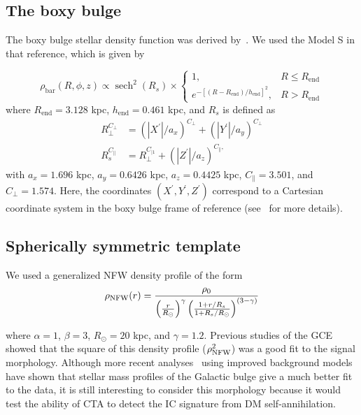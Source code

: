 \documentclass[doublespace,nopageskip]{VTthesis} %
\begin{document}
\begin{appendices}
\subsection{The boxy bulge}

The boxy bulge stellar density function was derived by~\cite{Freudenreich:1998}. We used the Model S in that reference, which is given by

\begin{equation}
\rho_{\mathrm{bar}}(R, \phi, z) \propto  \operatorname{sech}^{2}\left(R_{s}\right)
 \times\left\{
 \begin{array}{lr}
1, & R \leq R_{\mathrm{end}} \\
e^{-\left[\left(R-R_{\mathrm{end}}\right) / h_{\mathrm{end}}\right]^{2}}, & R>R_{\mathrm{end}}
\end{array}\right.\label{eq:boxybulge}
\end{equation}
where $R_{\mathrm{end}}=3.128$ kpc, $h_{\mathrm{end}}=0.461$ kpc, and $R_s$ is defined as
\begin{equation}
\begin{aligned}
R_{\perp}^{C_{\perp}} &=\left(\left|X^{\prime}\right| / a_{x}\right)^{C_{\perp}}+\left(\left|Y^{\prime}\right| / a_{y}\right)^{C_{\perp}} \\
R_{s}^{C_{\|}} &=R_{\perp}^{C_{\mid 1}}+\left(\left|Z^{\prime}\right| / a_{z}\right)^{C_{\|},}
\end{aligned}    
\end{equation}
with  $a_{x}=1.696$ kpc, $a_{y}=0.6426$ kpc, $a_{z}=0.4425$ kpc, $C_{\|}=3.501$, and $C_{\perp}=1.574$.  Here, the coordinates $(X^\prime,Y^\prime,Z^\prime)$ correspond to a Cartesian coordinate system in the boxy bulge frame of reference (see~\citealt{Song:2019nrx} for more details).

\subsection{Spherically symmetric template}

We used a generalized NFW density profile of the form 
\begin{equation}\label{eq:NFW}
    \rho_{\rm NFW}(r)=\frac{\rho_{0}}{\left(\frac{r}{R_{\odot}}\right)^{\gamma}\left(\frac{1+r / R_{s}}{1+R_{s} / R_{\odot}}\right)^{(3-\gamma)}}
\end{equation}

where $\alpha=1$, $\beta=3$, $R_{\odot}=20$ kpc, and $\gamma=1.2$. Previous studies of the GCE~\citep{Abazajian:2012pn,Gordon:2013vta,Daylan:2014rsa,Calore:2015bsx} showed that the square of this density profile ($\rho^2_{\rm NFW}$)  was a good fit to the signal morphology. Although more recent analyses~\citep{Macias:2016nev,Bartels:2017vsx,Macias:2019omb,Abazajian:2020tww} using improved background models have shown that stellar mass profiles of the Galactic bulge give a much better fit to the data, it is still interesting to consider this morphology because it  would test the ability of CTA to detect the IC signature from DM self-annihilation.


\end{appendices}
\end{document}
